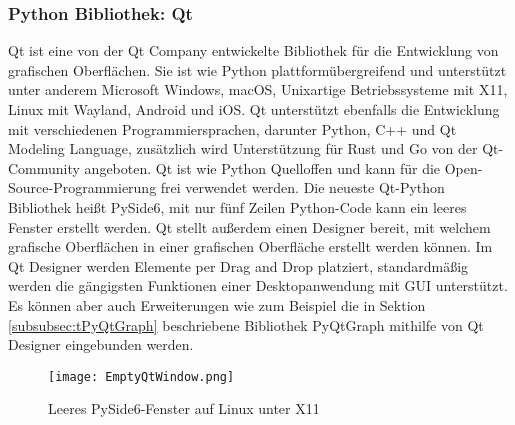 \subsubsection{Python Bibliothek: Qt}
\label{subsubsec:tQt}
Qt ist eine von der Qt Company entwickelte Bibliothek für die Entwicklung von grafischen Oberflächen. Sie ist wie Python plattformübergreifend und unterstützt unter anderem Microsoft Windows, macOS, Unixartige Betriebssysteme mit X11, Linux mit Wayland, Android und iOS. Qt unterstützt ebenfalls die Entwicklung mit verschiedenen Programmiersprachen, darunter Python, C++ und Qt Modeling Language, zusätzlich wird Unterstützung für Rust und Go von der Qt-Community angeboten. Qt ist wie Python Quelloffen und kann für die Open-Source-Programmierung frei verwendet werden. Die neueste Qt-Python Bibliothek heißt PySide6, mit nur fünf Zeilen Python-Code kann ein leeres Fenster erstellt werden. Qt stellt außerdem einen Designer bereit, mit welchem grafische Oberflächen in einer grafischen Oberfläche erstellt werden können. Im Qt Designer werden Elemente per Drag and Drop platziert, standardmäßig werden die gängigsten Funktionen einer Desktopanwendung mit \ac{GUI} unterstützt. Es können aber auch Erweiterungen wie zum Beispiel die in Sektion \ref{subsubsec:tPyQtGraph} beschriebene Bibliothek PyQtGraph mithilfe von Qt Designer eingebunden werden.
\begin{figure}[h]
\centering
\texttt{[image: EmptyQtWindow.png]}
\caption{Leeres PySide6-Fenster auf Linux unter X11}
\label{fig:EmptyQtWindow}
\end{figure}

